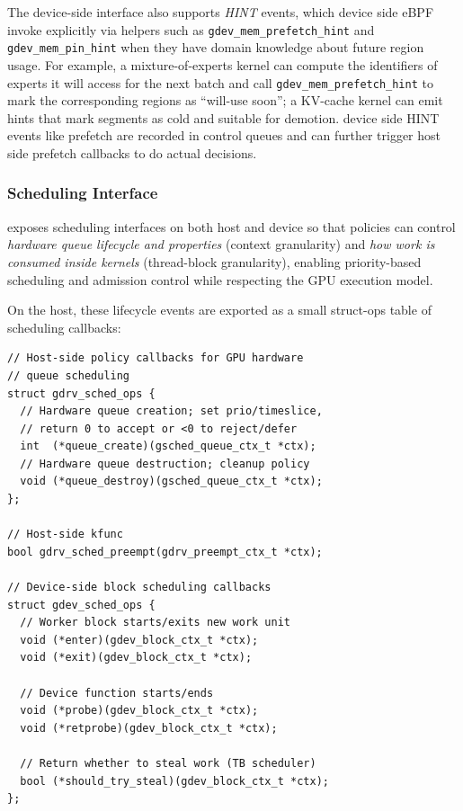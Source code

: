 The device-side interface also supports \emph{HINT} events, which device side eBPF 
invoke explicitly via helpers such as \texttt{gdev\_mem\_prefetch\_hint} and \texttt{gdev\_mem\_pin\_hint} when they have domain knowledge about future region usage. For
example, a mixture-of-experts kernel can compute the identifiers of experts it
will access for the next batch and call \texttt{gdev\_mem\_prefetch\_hint} to mark
the corresponding regions as ``will-use soon'';
a KV-cache kernel can emit hints that mark segments as cold and suitable for
demotion. device side HINT events like prefetch are recorded in control queues and can further trigger host side prefetch callbacks to do actual decisions.

\subsubsection{Scheduling Interface}
\label{sec:design-sched}

\sys exposes scheduling interfaces on both host and device so that policies can control
\emph{hardware queue lifecycle and properties} (context granularity) and \emph{how work is consumed inside kernels} (thread-block granularity), enabling priority-based scheduling and admission control while respecting the GPU execution model.

On the host, these lifecycle events are exported as a small struct-ops table of
scheduling callbacks:

\begin{verbatim}
// Host-side policy callbacks for GPU hardware
// queue scheduling
struct gdrv_sched_ops {
  // Hardware queue creation; set prio/timeslice,
  // return 0 to accept or <0 to reject/defer
  int  (*queue_create)(gsched_queue_ctx_t *ctx);
  // Hardware queue destruction; cleanup policy
  void (*queue_destroy)(gsched_queue_ctx_t *ctx);
};

// Host-side kfunc
bool gdrv_sched_preempt(gdrv_preempt_ctx_t *ctx);

// Device-side block scheduling callbacks
struct gdev_sched_ops {
  // Worker block starts/exits new work unit
  void (*enter)(gdev_block_ctx_t *ctx);
  void (*exit)(gdev_block_ctx_t *ctx);
  
  // Device function starts/ends
  void (*probe)(gdev_block_ctx_t *ctx);
  void (*retprobe)(gdev_block_ctx_t *ctx);
  
  // Return whether to steal work (TB scheduler)
  bool (*should_try_steal)(gdev_block_ctx_t *ctx);
};
\end{verbatim}

